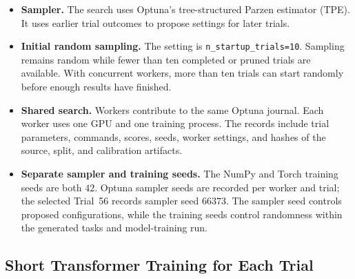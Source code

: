 \documentclass[11pt]{article}
\newenvironment{notes}
  {\begin{itemize}\setlength{\itemsep}{0.45em}\setlength{\parsep}{0pt}}
  {\end{itemize}}
\begin{document}
\begin{notes}
    \item \textbf{Sampler.}
    The search uses Optuna's tree-structured Parzen estimator
    (TPE). It uses earlier trial outcomes to propose settings
    for later trials.

    \item \textbf{Initial random sampling.}
    The setting is \texttt{n\_startup\_trials=10}.
    Sampling remains random while fewer than ten completed
    or pruned trials are available. With concurrent workers,
    more than ten trials can start randomly before enough
    results have finished.

    \item \textbf{Shared search.}
    Workers contribute to the same Optuna journal.
    Each worker uses one GPU and one training process.
    The records include trial parameters, commands, scores,
    seeds, worker settings, and hashes of the source,
    split, and calibration artifacts.

    \item \textbf{Separate sampler and training seeds.}
    The NumPy and Torch training seeds are both \(42\).
    Optuna sampler seeds are recorded per worker and trial;
    the selected Trial~56 records sampler seed \(66373\).
    The sampler seed controls proposed configurations, while
    the training seeds control randomness within the
    generated tasks and model-training run.
\end{notes}

\subsection{Short Transformer Training for Each Trial}
\label{sec:proxy-training}
\end{document}
